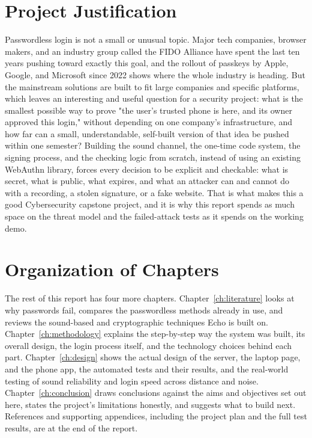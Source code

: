 \section{Project Justification}

Passwordless login is not a small or unusual topic. Major tech companies,
browser makers, and an industry group called the FIDO Alliance have spent
the last ten years pushing toward exactly this goal, and the rollout of
passkeys by Apple, Google, and Microsoft since 2022 shows where the whole
industry is heading. But the mainstream solutions are built to fit large
companies and specific platforms, which leaves an interesting and useful
question for a security project: what is the smallest possible way to
prove "the user's trusted phone is here, and its owner approved this
login," without depending on one company's infrastructure, and how far can
a small, understandable, self-built version of that idea be pushed within
one semester? Building the sound channel, the one-time code system, the
signing process, and the checking logic from scratch, instead of using an
existing WebAuthn library, forces every decision to be explicit and
checkable: what is secret, what is public, what expires, and what an
attacker can and cannot do with a recording, a stolen signature, or a fake
website. That is what makes this a good Cybersecurity capstone project,
and it is why this report spends as much space on the threat model and the
failed-attack tests as it spends on the working demo.

\section{Organization of Chapters}

The rest of this report has four more chapters. Chapter~\ref{ch:literature}
looks at why passwords fail, compares the passwordless methods already in
use, and reviews the sound-based and cryptographic techniques Echo is
built on. Chapter~\ref{ch:methodology} explains the step-by-step way the
system was built, its overall design, the login process itself, and the
technology choices behind each part. Chapter~\ref{ch:design} shows the
actual design of the server, the laptop page, and the phone app, the
automated tests and their results, and the real-world testing of sound
reliability and login speed across distance and noise. Chapter~\ref{ch:conclusion}
draws conclusions against the aims and objectives set out here, states the
project's limitations honestly, and suggests what to build next.
References and supporting appendices, including the project plan and the
full test results, are at the end of the report.
